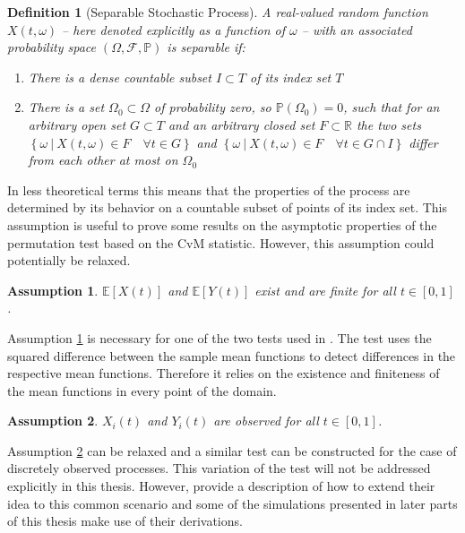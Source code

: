 \documentclass[12pt, a4paper]{article}
\theoremstyle{MAstyle} \newtheorem{assumption}{Assumption}[section]
\theoremstyle{MAstyle} \newtheorem{definition}{Definition}[section]
\theoremstyle{MAstyle} \newtheorem{theorem}{Theorem}[section]
\begin{document}
			\begin{definition}[Separable Stochastic Process]\label{separability}
				A real-valued random function $X(t, \omega)$ -- here denoted explicitly as a function of $\omega$ -- with an associated probability space $\left(\Omega, \mathcal{F}, \mathbb{P}\right)$ is separable if:
				\begin{enumerate}
					\item There is a dense countable subset $I \subset T$ of its index set $T$
					\item There is a set $\Omega_0 \subset \Omega$ of probability zero, so $\mathbb{P}\left(\Omega_0\right) = 0$, such that for an arbitrary open set $G \subset T$ and an arbitrary closed set $F \subset \mathbb{R}$ the two sets $\left\{\omega \ \vert \ X(t, \omega) \in F \quad \forall t \in G\right\}$ and $\left\{\omega \ \vert \ X(t, \omega) \in F \quad \forall t \in G \cap I\right\}$ differ from each other at most on $\Omega_0$
				\end{enumerate}      
			\end{definition}
			In less theoretical terms this means that the properties of the process are determined by its behavior on a countable subset of points of its index set. This assumption is useful to prove some results on the asymptotic properties of the permutation test based on the CvM statistic. However, this assumption could potentially be relaxed.
		
			\begin{assumption}\label{mean_existence}
				$\mathbb{E}\left[X(t)\right]$ and $\mathbb{E}\left[Y(t)\right]$ exist and are finite for all $t \in [0, 1]$.
			\end{assumption}
			Assumption \ref{mean_existence} is necessary for one of the two tests used in \cite{bugni_permutation_2021}. The test uses the squared difference between the sample mean functions to detect differences in the respective mean functions. Therefore it relies on the existence and finiteness of the mean functions in every point of the domain.
		
			\begin{assumption}\label{continuous_observation}
				$X_i(t)$ and $Y_i(t)$ are observed for all $t \in [0,1]$.
			\end{assumption}
			Assumption \ref{continuous_observation} can be relaxed and a similar test can be constructed for the case of discretely observed processes. This variation of the test will not be addressed explicitly in this thesis. However, \cite{bugni_permutation_2021} provide a description of how to extend their idea to this common scenario and some of the simulations presented in later parts of this thesis make use of their derivations.
	
\end{document}

